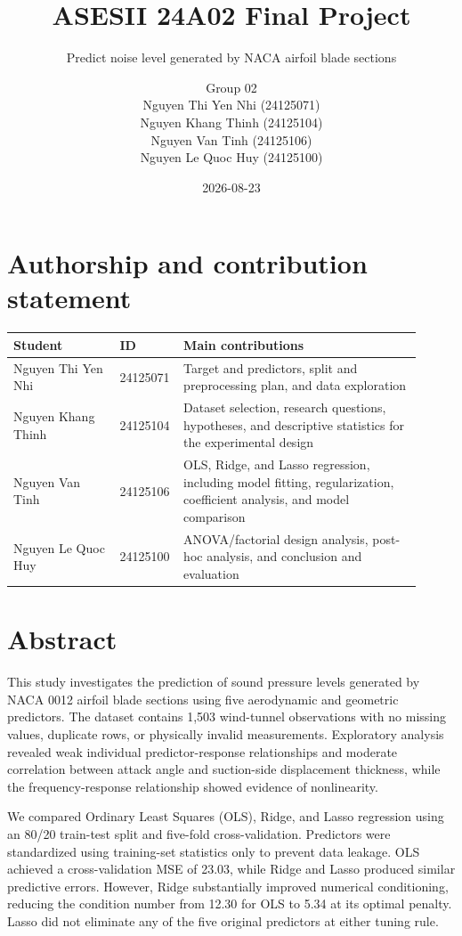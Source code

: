 \documentclass[
  11pt,
]{article}
\title{ASESII 24A02 Final Project}
\subtitle{Predict noise level generated by NACA airfoil blade sections}
\author{Group 02\\
Nguyen Thi Yen Nhi (24125071)\\
Nguyen Khang Thinh (24125104)\\
Nguyen Van Tinh (24125106)\\
Nguyen Le Quoc Huy (24125100)}
\date{2026-08-23}
\begin{document}
\maketitle

{
\setcounter{tocdepth}{2}
\tableofcontents
}
\section*{Authorship and contribution
statement}\label{authorship-and-contribution-statement}

  \begingroup
  \renewcommand{\arraystretch}{1.3}
  \begin{tabular}{p{0.25\linewidth} p{0.09\linewidth} p{0.57\linewidth}}
  \hline
  Student & ID & Main contributions  \\
  \hline
  Nguyen Thi Yen Nhi & 24125071 &
  Target and predictors, split and preprocessing plan, and data exploration  \\
  \hline
  Nguyen Khang Thinh & 24125104 &
  Dataset selection, research questions, hypotheses, and descriptive statistics for the experimental design \\
  \hline
  Nguyen Van Tinh & 24125106 &
  OLS, Ridge, and Lasso regression, including model fitting, regularization, coefficient analysis, and model comparison \\
  \hline
  Nguyen Le Quoc Huy & 24125100 &
  ANOVA/factorial design analysis, post-hoc analysis, and conclusion and evaluation \\
  \hline
  \end{tabular}
  \endgroup

\section*{Abstract}\label{abstract}

This study investigates the prediction of sound pressure levels
generated by NACA 0012 airfoil blade sections using five aerodynamic and
geometric predictors. The dataset contains 1,503 wind-tunnel
observations with no missing values, duplicate rows, or physically
invalid measurements. Exploratory analysis revealed weak individual
predictor-response relationships and moderate correlation between attack
angle and suction-side displacement thickness, while the
frequency-response relationship showed evidence of nonlinearity.

We compared Ordinary Least Squares (OLS), Ridge, and Lasso regression
using an 80/20 train-test split and five-fold cross-validation.
Predictors were standardized using training-set statistics only to
prevent data leakage. OLS achieved a cross-validation MSE of 23.03,
while Ridge and Lasso produced similar predictive errors. However, Ridge
substantially improved numerical conditioning, reducing the condition
number from 12.30 for OLS to 5.34 at its optimal penalty. Lasso did not
eliminate any of the five original predictors at either tuning rule.
\end{document}
